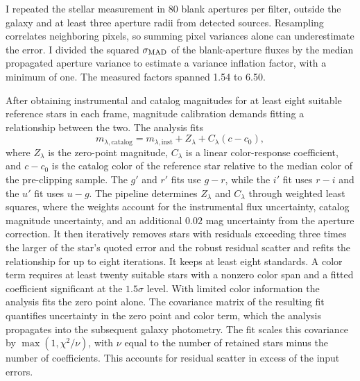 I repeated the stellar measurement in 80 blank apertures per filter, outside the galaxy and at least three aperture radii from detected sources. Resampling correlates neighboring pixels, so summing pixel variances alone can underestimate the error. I divided the squared $\sigma_{\rm MAD}$ of the blank-aperture fluxes by the median propagated aperture variance to estimate a variance inflation factor, with a minimum of one. The measured factors spanned 1.54 to 6.50.

After obtaining instrumental and catalog magnitudes for at least eight suitable reference stars in each frame, magnitude calibration demands fitting a relationship between the two. The analysis fits
\begin{equation}
    m_{\lambda,\mathrm{catalog}} =
    m_{\lambda,\mathrm{inst}}+Z_\lambda+C_\lambda(c-c_0),
    \label{eq:color-cal}
\end{equation}
where $Z_\lambda$ is the zero-point magnitude, $C_\lambda$ is a linear color-response coefficient, and $c-c_0$ is the catalog color of the reference star relative to the median color of the pre-clipping sample. The $g'$ and $r'$ fits use $g-r$, while the $i'$ fit uses $r-i$ and the $u'$ fit uses $u-g$. The pipeline determines $Z_\lambda$ and $C_\lambda$ through weighted least squares, where the weights account for the instrumental flux uncertainty, catalog magnitude uncertainty, and an additional $0.02$ mag uncertainty from the aperture correction. It then iteratively removes stars with residuals exceeding three times the larger of the star's quoted error and the robust residual scatter and refits the relationship for up to eight iterations. It keeps at least eight standards. A color term requires at least twenty suitable stars with a nonzero color span and a fitted coefficient significant at the $1.5\sigma$ level. With limited color information the analysis fits the zero point alone. The covariance matrix of the resulting fit quantifies uncertainty in the zero point and color term, which the analysis propagates into the subsequent galaxy photometry. The fit scales this covariance by $\max(1,\chi^2/\nu)$, with $\nu$ equal to the number of retained stars minus the number of coefficients. This accounts for residual scatter in excess of the input errors.

